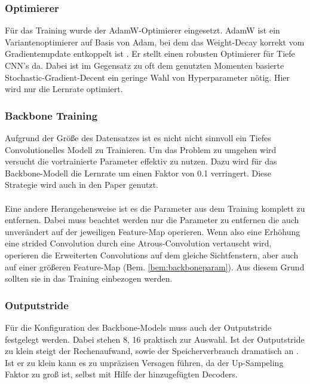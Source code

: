 \documentclass[12pt,DIV=15,BCOR=15mm,twoside,headsepline,abstract=true,listof=totoc,bibliography=totoc]{scrreprt}
\theoremstyle{remark}    %
\begin{document}
    \subsubsection{Optimierer}
    Für das Training wurde der AdamW-Optimierer eingesetzt. AdamW ist ein Variantenoptimierer auf Basis von Adam, bei dem das Weight-Decay korrekt vom 
    Gradientenupdate entkoppelt ist \cite{loshchilov2019decoupledweightdecayregularization}. Er stellt einen robusten Optimierer für Tiefe \ac{CNN}'s
    da. Dabei ist im Gegensatz zu oft dem genutzten Momenten basierte Stochastic-Gradient-Decent ein geringe Wahl von Hyperparameter nötig. Hier wird 
    nur die Lernrate optimiert.

    \subsubsection{Backbone Training}
    Aufgrund der Größe des Datensatzes ist es nicht nicht sinnvoll ein Tiefes Convolutionelles Modell zu Trainieren. Um das Problem zu umgehen wird versucht
    die vortrainierte Parameter effektiv zu nutzen. Dazu wird für das Backbone-Modell die Lernrate um einen Faktor von 0.1 verringert. Diese Strategie wird auch
    in den Paper \cite{chen2017rethinkingatrousconvolutionsemantic} genutzt.\\\\
    Eine andere Herangehensweise ist es die Parameter aus dem Training komplett zu entfernen. Dabei muss beachtet werden nur die Parameter zu entfernen die auch
    unverändert auf der jeweiligen Feature-Map operieren. Wenn also eine Erhöhung eine strided Convolution durch eine Atrous-Convolution vertauscht wird, operieren
    die Erweiterten Convolutions auf dem gleiche Sichtfenstern, aber auch auf einer größeren Feature-Map (Bem. \ref{bem:backboneparam}). Aus diesem Grund sollten sie in 
    das Training einbezogen werden.
    \subsubsection{Outputstride}
    Für die Konfiguration des Backbone-Models muss auch der Outputstride festgelegt werden. Dabei stehen 8, 16 praktisch zur Auswahl. Ist der Outputstride zu klein 
    steigt der Rechenaufwand, sowie der Speicherverbrauch dramatisch an \cite{chen2017rethinkingatrousconvolutionsemantic}. Ist er zu klein kann es zu unpräzisen
    Versagen führen, da der Up-Sampeling Faktor zu groß ist, selbst mit Hilfe der hinzugefügten Decoders.
\end{document}
